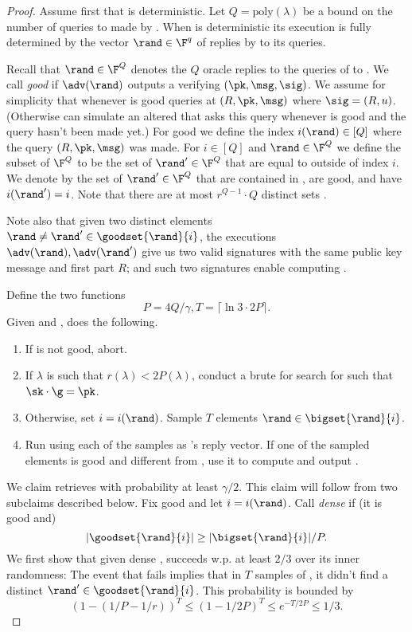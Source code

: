 \documentclass[11pt]{article}
\numberwithin{equation}{section} %
\numberwithin{figure}{section} %
\newcommand{\poly}{\ensuremath{\mathrm{poly}(\lambda)}\xspace}
\begin{document}
 \begin{proof}
 
  Assume first that \adv is deterministic. Let $Q=\poly$ be a bound on the number of queries to \RO made by \adv. When \adv is deterministic its execution is fully 
  determined by the vector $\rand \in \F^q$ of replies by \RO to its queries.  
  
  Recall that $\rand\in \F^Q$ denotes the $Q$ oracle replies to the queries of \adv to \RO.
  We call \rand \emph{good} if $\adv(\rand)$ outputs a verifying $(\pk,\msg,\sig)$.
  We assume for simplicity that whenever \rand is good \adv queries \RO at $(R,\pk,\msg)$ where $\sig = (R,u)$.
  (Otherwise \ext can simulate an altered \adv that asks this query whenever \rand is good and the query hasn't been made yet.)
  For good \rand we define the index $i(\rand)\in [Q]$ where the query $(R,\pk,\msg)$ was made. 
  For $i\in [Q]$ and $\rand\in\F^Q$ we define the subset  of $\F^Q$ to be the set of $\rand' \in \F^Q$ that are equal to \rand outside of index $i$.
  We denote by  the set of $\rand'\in \F^Q$ that are contained in , are good, and have $i(\rand')=i$.
   Note that there are at most $r^{Q-1}\cdot Q$ distinct sets .
 
 Note also that given two distinct elements $\rand\neq \rand'\in\goodset{\rand}{i}$, the executions $\adv(\rand),\adv(\rand')$ give us two valid signatures with the same public key \pk message \msg and first part $R$;
  and such two signatures enable computing \sk.
  
 Define the two functions
   \[ P = 4Q/\gamma, T=\lceil \ln 3\cdot 2 P \rceil.\]
  Given \rand and \adv, \ext does the following.
  \begin{enumerate}
  \item If \rand is not good, abort.
  \item If $\lambda$ is such that $r(\lambda)< 2P(\lambda)$, conduct a brute for search for \sk such that $\sk\cdot \g = \pk$.
   \item Otherwise, set $i=i(\rand)$. Sample $T$ elements $\rand\in \bigset{\rand}{i}$.
   \item Run \adv using each of the samples as \RO's reply vector. If one of the sampled elements is good and different from \rand, use it to compute and output \sk.
    \end{enumerate}
  We claim \ext retrieves \sk with probability at least $\gamma/2$. This claim will follow from two subclaims described below.
  Fix good \rand and let $i=i(\rand)$.
  Call \rand \emph{dense} if (it is good and) 
  \[|\goodset{\rand}{i}|\geq |\bigset{\rand}{i}|/P.\]
  We first show that given dense \rand, \ext succeeds w.p. at least $2/3$ over its inner randomness:
  The event that \ext fails implies that in $T$ samples of , it didn't find a distinct $\rand'\in \goodset{\rand}{i}$. This probability is bounded by
  \[(1-(1/P-1/r))^T \leq (1-1/2P)^T \leq e^{-T/2P}\leq 1/3.\]
  

\end{proof}
\end{document}
